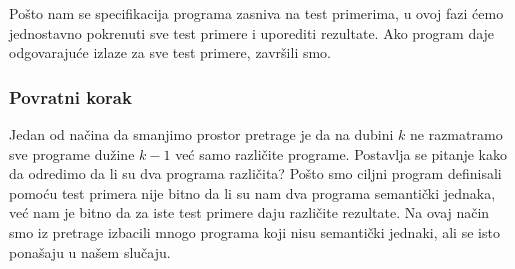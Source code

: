 Pošto nam se specifikacija programa zasniva na test primerima, u ovoj fazi ćemo jednostavno pokrenuti sve test primere i uporediti rezultate. Ako program daje odgovarajuće izlaze za sve test primere, završili smo.


\subsubsection*{Povratni korak}


Jedan od načina da smanjimo prostor pretrage je da na dubini $k$ ne razmatramo sve programe dužine $k-1$ već samo različite programe. Postavlja se pitanje kako da odredimo da li su dva programa različita? Pošto smo ciljni program definisali pomoću test primera nije bitno da li su nam dva programa semantički jednaka, već nam je bitno da za iste test primere daju različite rezultate. Na ovaj način smo iz pretrage izbacili mnogo programa koji nisu semantički jednaki, ali se isto ponašaju u našem slučaju.
